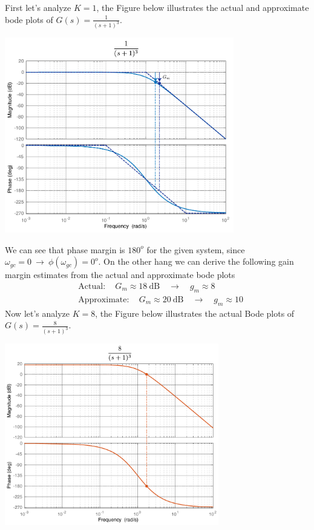 \documentclass[twoside]{article}
\begin{document}
First let's analyze $K = 1$, the Figure below illustrates the
actual and approximate bode plots of $G(s) = \frac{1}{(s+1)^3}$.

\begin{center}
\begin{minipage}[h]{\linewidth}
    \begin{center}
      \includegraphics[width=0.75\textwidth]{margin2}
    \end{center}
\end{minipage}
\end{center}

We can see that phase margin is $180^o$ for the given system,
since $\omega_{gc} = 0 \ \rightarrow \ \phi (\omega_{gc} ) = 0^o$. 
On the other hang we can derive the following gain margin estimates
from the actual and approximate bode plots
%
\begin{align*}
	&\mathrm{Actual:} \quad G_m \approx 18 \ \mathrm{dB} \quad \rightarrow \quad g_m \approx 8	
	\\
	&\mathrm{Approximate:} \quad G_m \approx 20 \ \mathrm{dB} \quad \rightarrow \quad g_m \approx 10
\end{align*}
%
Now let's analyze $K = 8$, the Figure below illustrates the
actual Bode plots of $G(s) = \frac{8}{(s+1)^3}$.


\begin{center}
\begin{minipage}[h]{\linewidth}
    \begin{center}
      \includegraphics[width=0.7\textwidth]{margin3actual}
    \end{center}
\end{minipage}
\end{center}
\end{document}
